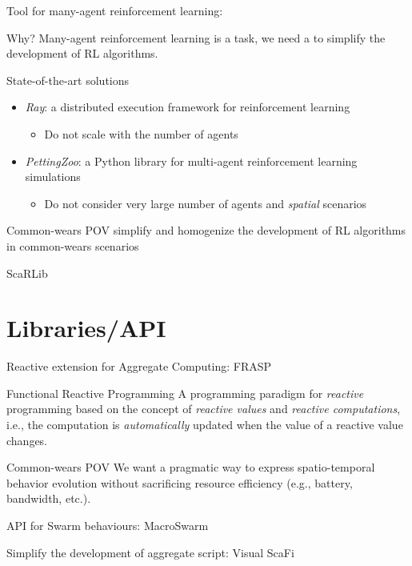 \documentclass[presentation, 9pt, aspectratio=169]{beamer}\mode<presentation>{\usetheme{AMSBolognaFC}}
\begin{document}
\begin{frame}{Tool for many-agent reinforcement learning: }
	\begin{alertblock}{Why?}
		Many-agent reinforcement learning is a  task, we need a  to simplify the development of RL algorithms.
	\end{alertblock}
	\begin{exampleblock}{State-of-the-art solutions}
		\begin{itemize}
			\item \emph{Ray}: a distributed execution framework for reinforcement learning
			\begin{itemize}
				\item Do not scale with the number of agents
			\end{itemize} 
			\item \emph{PettingZoo}: a Python library for multi-agent reinforcement learning simulations
			\begin{itemize}
				\item Do not consider very large number of agents and \emph{spatial} scenarios
			\end{itemize}
		\end{itemize}
	\end{exampleblock}
	\begin{exampleblock}{Common-wears POV}
		simplify and homogenize the development of RL algorithms in common-wears scenarios \faArrowRight \, 
	\end{exampleblock}
\end{frame}
\begin{frame}{ScaRLib}
	
\end{frame}
\section{Libraries/API}
\begin{frame}{Reactive extension for Aggregate Computing: FRASP}
	\begin{alertblock}{Functional Reactive Programming}
		A programming paradigm for \emph{reactive} programming based on the concept of \emph{reactive values} and \emph{reactive computations}, i.e., the computation is \emph{automatically} updated when the value of a reactive value changes.
	\end{alertblock}
	\begin{exampleblock}{Common-wears POV}
		We want a pragmatic way to express spatio-temporal behavior evolution without sacrificing resource efficiency (e.g., battery, bandwidth, etc.).
	\end{exampleblock}
\end{frame}
\begin{frame}{API for Swarm behaviours: MacroSwarm}

\end{frame}
\begin{frame}{Simplify the development of aggregate script: Visual ScaFi}

\end{frame}
\end{document}
